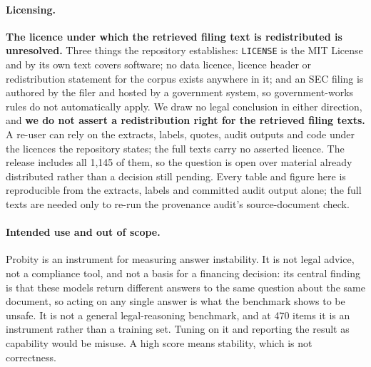 \paragraph{Licensing.} \textbf{The licence under which the retrieved filing text is redistributed is
unresolved.} Three things the repository establishes: \texttt{LICENSE} is the MIT License and by its
own text covers software; no data licence, licence header or redistribution statement for the corpus
exists anywhere in it; and an SEC filing is authored by the filer and hosted by a government system,
so government-works rules do not automatically apply. We draw no legal conclusion in either
direction, and \textbf{we do not assert a redistribution right for the retrieved filing texts.} A
re-user can rely on the extracts, labels, quotes, audit outputs and code under the licences the
repository states; the full texts carry no asserted licence. The release includes all 1{,}145 of them,
so the question is open over material already distributed rather than a decision still pending. Every
table and figure here is reproducible from the extracts, labels and committed audit output alone; the
full texts are needed only to re-run the provenance audit's source-document check.

\paragraph{Intended use and out of scope.} Probity is an instrument for measuring answer
instability. It is not legal advice, not a compliance tool, and not a basis for a financing
decision: its central finding is that these models return different answers to the same question
about the same document, so acting on any single answer is what the benchmark shows to be unsafe. It
is not a general legal-reasoning benchmark, and at 470 items it is an instrument rather than a
training set. Tuning on it and reporting the result as capability would be misuse. A high score
means stability, which is not correctness.
